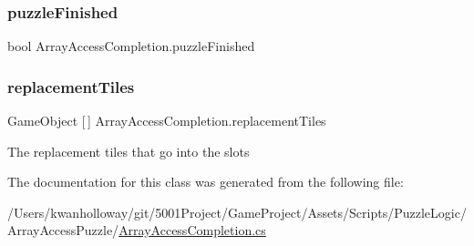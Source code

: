 \mbox{\label{class_array_access_completion_a1cddf9521f110a2868afa36514c9dcb4}} 
\subsubsection{\texorpdfstring{puzzle\+Finished}{puzzleFinished}}
{\footnotesize\ttfamily bool Array\+Access\+Completion.\+puzzle\+Finished}

\mbox{\label{class_array_access_completion_a97c6ec1f65786273d1186f23ce5b0f6c}} 
\subsubsection{\texorpdfstring{replacement\+Tiles}{replacementTiles}}
{\footnotesize\ttfamily Game\+Object \mbox{[}$\,$\mbox{]} Array\+Access\+Completion.\+replacement\+Tiles}



The replacement tiles that go into the slots 



The documentation for this class was generated from the following file\+:\begin{DoxyCompactItemize}
\item 
/\+Users/kwanholloway/git/5001\+Project/\+Game\+Project/\+Assets/\+Scripts/\+Puzzle\+Logic/\+Array\+Access\+Puzzle/\hyperlink{_array_access_completion_8cs}{Array\+Access\+Completion.\+cs}\end{DoxyCompactItemize}
